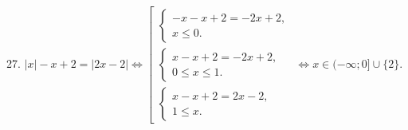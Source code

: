 27. $|x|-x+2=|2x-2|\Leftrightarrow \left[\begin{array}{l}\begin{cases} -x-x+2=-2x+2,\\ x\leqslant 0.\end{cases}\\
\begin{cases} x-x+2=-2x+2,\\ 0\leqslant x\leqslant 1 .\end{cases}\\\begin{cases} x-x+2=2x-2,\\ 1\leqslant x.\end{cases}\end{array}\right.\Leftrightarrow
x\in (-\infty;0]\cup\{2\}.$\\
